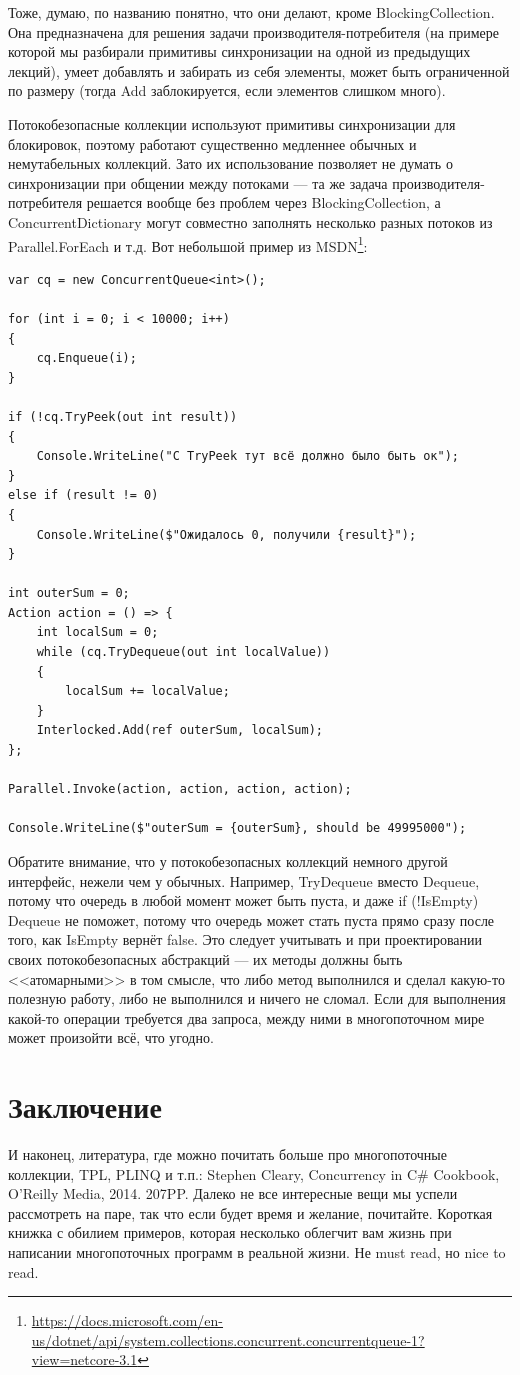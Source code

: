\documentclass{../../text-style}
\begin{document}
Тоже, думаю, по названию понятно, что они делают, кроме BlockingCollection. Она предназначена для решения задачи производителя-потребителя (на примере которой мы разбирали примитивы синхронизации на одной из предыдущих лекций), умеет добавлять и забирать из себя элементы, может быть ограниченной по размеру (тогда Add заблокируется, если элементов слишком много).

Потокобезопасные коллекции используют примитивы синхронизации для блокировок, поэтому работают существенно медленнее обычных и немутабельных коллекций. Зато их использование позволяет не думать о синхронизации при общении между потоками --- та же задача производителя-потребителя решается вообще без проблем через BlockingCollection, а ConcurrentDictionary могут совместно заполнять несколько разных потоков из Parallel.ForEach и т.д. Вот небольшой пример из MSDN\footnote{\url{https://docs.microsoft.com/en-us/dotnet/api/system.collections.concurrent.concurrentqueue-1?view=netcore-3.1}}:

\begin{verbatim}
var cq = new ConcurrentQueue<int>();

for (int i = 0; i < 10000; i++) 
{
    cq.Enqueue(i);
}

if (!cq.TryPeek(out int result))
{
    Console.WriteLine("С TryPeek тут всё должно было быть ок");
}
else if (result != 0)
{
    Console.WriteLine($"Ожидалось 0, получили {result}");
}

int outerSum = 0;
Action action = () => {
    int localSum = 0;
    while (cq.TryDequeue(out int localValue)) 
    {
        localSum += localValue;
    }
    Interlocked.Add(ref outerSum, localSum);
};

Parallel.Invoke(action, action, action, action);

Console.WriteLine($"outerSum = {outerSum}, should be 49995000");
\end{verbatim}

Обратите внимание, что у потокобезопасных коллекций немного другой интерфейс, нежели чем у обычных. Например, TryDequeue вместо Dequeue, потому что очередь в любой момент может быть пуста, и даже if (!IsEmpty) Dequeue не поможет, потому что очередь может стать пуста прямо сразу после того, как IsEmpty вернёт false. Это следует учитывать и при проектировании своих потокобезопасных абстракций --- их методы должны быть <<атомарными>> в том смысле, что либо метод выполнился и сделал какую-то полезную работу, либо не выполнился и ничего не сломал. Если для выполнения какой-то операции требуется два запроса, между ними в многопоточном мире может произойти всё, что угодно.

\section{Заключение}

И наконец, литература, где можно почитать больше про многопоточные коллекции, TPL, PLINQ и т.п.: Stephen Cleary, Concurrency in C\# Cookbook, O'Reilly Media, 2014. 207PP. Далеко не все интересные вещи мы успели рассмотреть на паре, так что если будет время и желание, почитайте. Короткая книжка с обилием примеров, которая несколько облегчит вам жизнь при написании многопоточных программ в реальной жизни. Не must read, но nice to read.
\end{document}

